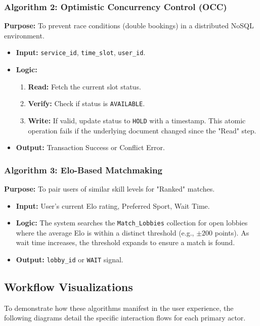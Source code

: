 \documentclass[12pt, a4paper]{article}
\begin{document}
\subsubsection{Algorithm 2: Optimistic Concurrency Control (OCC)}
\textbf{Purpose:} To prevent race conditions (double bookings) in a distributed NoSQL environment.
\begin{itemize}
    \item \textbf{Input:} \texttt{service\_id}, \texttt{time\_slot}, \texttt{user\_id}.
    \item \textbf{Logic:}
    \begin{enumerate}
        \item \textbf{Read:} Fetch the current slot status.
        \item \textbf{Verify:} Check if status is \texttt{AVAILABLE}.
        \item \textbf{Write:} If valid, update status to \texttt{HOLD} with a timestamp. This atomic operation fails if the underlying document changed since the "Read" step.
    \end{enumerate}
    \item \textbf{Output:} Transaction Success or Conflict Error.
\end{itemize}

\subsubsection{Algorithm 3: Elo-Based Matchmaking}
\textbf{Purpose:} To pair users of similar skill levels for "Ranked" matches.
\begin{itemize}
    \item \textbf{Input:} User's current Elo rating, Preferred Sport, Wait Time.
    \item \textbf{Logic:} The system searches the \texttt{Match\_Lobbies} collection for open lobbies where the average Elo is within a distinct threshold (e.g., $\pm 200$ points). As wait time increases, the threshold expands to ensure a match is found.
    \item \textbf{Output:} \texttt{lobby\_id} or \texttt{WAIT} signal.
\end{itemize}

\subsection{Workflow Visualizations}
To demonstrate how these algorithms manifest in the user experience, the following diagrams detail the specific interaction flows for each primary actor.
\end{document}
